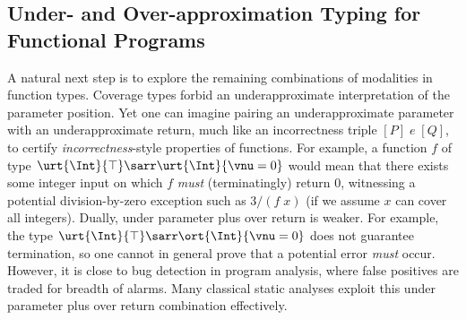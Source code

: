 \subsection{Under- and Over-approximation Typing for Functional Programs}

A natural next step is to explore the remaining combinations of modalities
in function types.
Coverage types forbid an underapproximate interpretation of the parameter
position.
Yet one can imagine pairing an underapproximate parameter with an
underapproximate return, much like an incorrectness triple $[P]\;e\;[Q]$, to certify
\emph{incorrectness}-style properties of functions.
For example, a function $f$ of type
$\urt{\Int}{\top} \sarr \urt{\Int}{\vnu = 0}$ would mean that there exists
some integer input on which $f$ \emph{must} (terminatingly) return $0$,
witnessing a potential division-by-zero exception such as $3 / (f\;x)$ (if we assume $x$ can cover all integers).
Dually, under parameter plus over return is weaker. For example, the type
$\urt{\Int}{\top} \sarr \ort{\Int}{\vnu = 0}$
does not guarantee termination, so one cannot in general prove that a potential error \emph{must} occur.
However, it is close to bug detection in program analysis, where false positives are traded for breadth of alarms. Many classical static analyses exploit this under parameter plus over return combination effectively.

